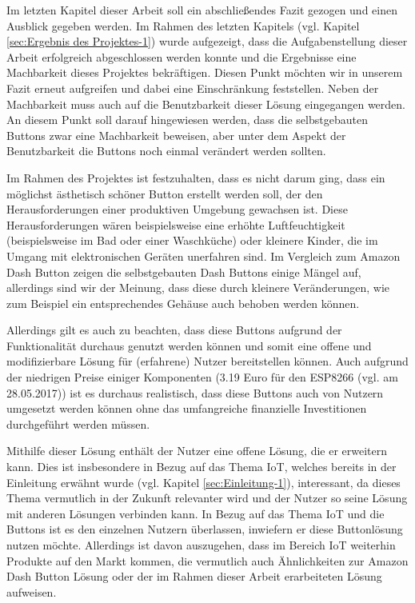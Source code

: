 Im letzten Kapitel dieser Arbeit soll ein abschließendes Fazit gezogen und einen Ausblick gegeben werden. Im Rahmen des letzten Kapitels (vgl. Kapitel \ref{sec:Ergebnis des Projektes-1}) wurde aufgezeigt, dass die Aufgabenstellung dieser Arbeit erfolgreich abgeschlossen werden konnte und die Ergebnisse eine Machbarkeit dieses Projektes bekräftigen. Diesen Punkt möchten wir in unserem Fazit erneut aufgreifen und dabei eine Einschränkung feststellen. Neben der Machbarkeit muss auch auf die Benutzbarkeit dieser Lösung eingegangen werden. An diesem Punkt soll  darauf hingewiesen werden, dass die selbstgebauten Buttons zwar eine Machbarkeit beweisen, aber unter dem Aspekt der Benutzbarkeit die Buttons noch einmal verändert werden sollten. 

Im Rahmen des Projektes ist festzuhalten, dass es nicht darum ging, dass ein möglichst ästhetisch schöner Button erstellt werden soll, der den Herausforderungen einer produktiven Umgebung gewachsen ist. Diese Herausforderungen wären beispielsweise eine erhöhte Luftfeuchtigkeit (beispielsweise im Bad oder einer Waschküche) oder kleinere Kinder, die im Umgang mit elektronischen Geräten unerfahren sind. Im Vergleich zum Amazon Dash Button zeigen die selbstgebauten Dash Buttons einige Mängel auf, allerdings sind wir der Meinung, dass diese durch kleinere Veränderungen, wie zum Beispiel ein entsprechendes Gehäuse auch behoben werden können. 

Allerdings gilt es auch zu beachten, dass diese Buttons aufgrund der Funktionalität durchaus genutzt werden können und somit eine offene und modifizierbare Lösung für (erfahrene) Nutzer bereitstellen können. Auch aufgrund der niedrigen Preise einiger Komponenten (3.19 Euro für den ESP8266 (vgl. \cite{.t} am 28.05.2017)) ist es durchaus realistisch, dass diese Buttons auch von Nutzern umgesetzt werden können ohne das umfangreiche finanzielle Investitionen durchgeführt werden müssen. 

Mithilfe dieser Lösung enthält der Nutzer eine offene Lösung, die er erweitern kann. Dies ist insbesondere in Bezug auf das Thema \ac{IoT}, welches bereits in der Einleitung erwähnt wurde (vgl. Kapitel \ref{sec:Einleitung-1}), interessant, da dieses Thema vermutlich in der Zukunft relevanter wird und der Nutzer so seine Lösung mit anderen Lösungen verbinden kann. In Bezug auf das Thema \ac{IoT} und die Buttons ist es den einzelnen Nutzern überlassen, inwiefern er diese Buttonlösung nutzen möchte. Allerdings ist davon auszugehen, dass im Bereich \ac{IoT} weiterhin Produkte auf den Markt kommen, die vermutlich auch Ähnlichkeiten zur Amazon Dash Button Lösung oder der im Rahmen dieser Arbeit erarbeiteten Lösung aufweisen. 

